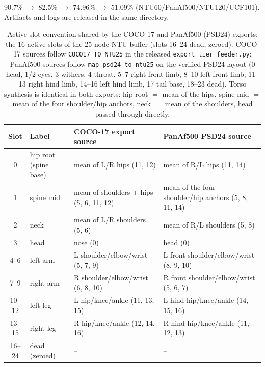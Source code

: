 \documentclass[11pt,a4paper]{article}
\begin{document}
90.7\% $\to$ 82.5\% $\to$ 74.96\% $\to$ 51.09\% (NTU60/PanAf500/NTU120/UCF101). Artifacts and logs are released in the same directory.

\begin{table}[htbp]
\centering
\footnotesize
\caption{Active-slot convention shared by the COCO-17 and PanAf500 (PSD24) exports: the 16 active slots of the 25-node NTU buffer (slots 16--24 dead, zeroed). COCO-17 sources follow \texttt{COCO17\_TO\_NTU25} in the released \texttt{export\_tier\_feeder.py}; PanAf500 sources follow \texttt{map\_psd24\_to\_ntu25} on the verified PSD24 layout (0 head, 1/2 eyes, 3 withers, 4 throat, 5--7 right front limb, 8--10 left front limb, 11--13 right hind limb, 14--16 left hind limb, 17 tail base, 18--23 dead). Torso synthesis is identical in both exports: hip root $=$ mean of the hips, spine mid $=$ mean of the four shoulder/hip anchors, neck $=$ mean of the shoulders, head passed through directly.}
\label{tab:slotmap}
\begin{tabularx}{\linewidth}{@{}c l X X@{}}
\toprule
Slot & Label & COCO-17 export source & PanAf500 PSD24 source \\
\midrule
0 & hip root (spine base) & mean of L/R hips (11, 12) & mean of R/L hips (11, 14) \\
1 & spine mid & mean of shoulders + hips (5, 6, 11, 12) & mean of the four shoulder/hip anchors (5, 8, 11, 14) \\
2 & neck & mean of L/R shoulders (5, 6) & mean of R/L shoulders (5, 8) \\
3 & head & nose (0) & head (0) \\
4--6 & left arm & L shoulder/elbow/wrist (5, 7, 9) & L front shoulder/elbow/wrist (8, 9, 10) \\
7--9 & right arm & R shoulder/elbow/wrist (6, 8, 10) & R front shoulder/elbow/wrist (5, 6, 7) \\
10--12 & left leg & L hip/knee/ankle (11, 13, 15) & L hind hip/knee/ankle (14, 15, 16) \\
13--15 & right leg & R hip/knee/ankle (12, 14, 16) & R hind hip/knee/ankle (11, 12, 13) \\
\midrule
16--24 & dead (zeroed) & -- & -- \\
\bottomrule
\end{tabularx}
\end{table}
\end{document}
